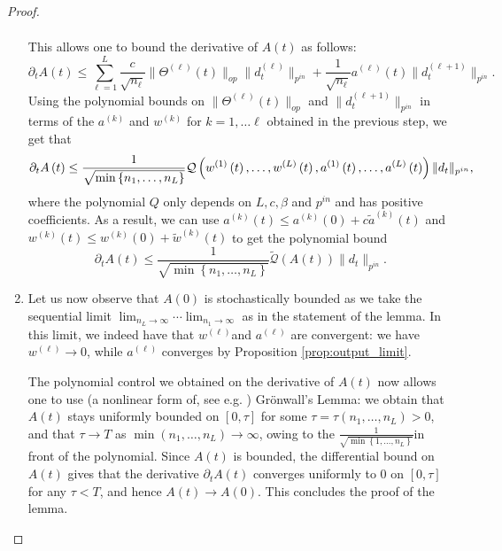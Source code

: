 \documentclass{article}
\begin{document}
\begin{proof}
\begin{enumerate}
\begin{align*}
\end{align*}
This allows one to bound the derivative of $A\left(t\right)$ as follows:
\[
\partial_{t}A\left(t\right)\le\sum_{\ell=1}^{L}\frac{c}{\sqrt{n_{\ell}}}\|\Theta^{(\ell)}(t)\|_{op}\|d_{t}^{(\ell)}\|_{p^{in}}+\frac{1}{\sqrt{n_{\ell}}}a^{\left(\ell\right)}\left(t\right)\|d_{t}^{(\ell+1)}\|_{p^{in}}.
\]
Using the polynomial bounds on $\|\Theta^{(\ell)}(t)\|_{op}$ and
$\|d_{t}^{(\ell+1)}\|_{p^{in}}$ in terms of the $a^{\left(k\right)}$
and $w^{\left(k\right)}$ for $k=1,\ldots\ell$ obtained in the previous
step, we get that 
\[
\text{\ensuremath{\partial_{t}A\left(t\right)\leq\frac{1}{\sqrt{\min\left\{ n_{1},\ldots,n_{L}\right\} }}\mathcal{Q}\left(w^{\left(1\right)}\left(t\right),\ldots,w^{\left(L\right)}\left(t\right),a^{\left(1\right)}\left(t\right),\ldots,a^{\left(L\right)}\left(t\right)\right)\|d_{t}\|_{p^{in}},}}
\]
where the polynomial $Q$ only depends on $L,c,\beta$ and $p^{in}$
and has positive coefficients. As a result, we can use $a^{\left(k\right)}\left(t\right)\leq a^{\left(k\right)}\left(0\right)+c\tilde{a}^{\left(k\right)}\left(t\right)$
and $w^{\left(k\right)}\left(t\right)\leq w^{\left(k\right)}\left(0\right)+\tilde{w}^{\left(k\right)}\left(t\right)$
to get the polynomial bound
\[
\partial_{t}A\left(t\right)\leq\frac{1}{\sqrt{\min\left\{ n_{1},\ldots,n_{L}\right\} }}\tilde{\mathcal{Q}}\left(A\left(t\right)\right)\|d_{t}\|_{p^{in}}.
\]
 

\item
Let us now observe that $A\left(0\right)$ is stochastically bounded
as we take the sequential limit $\lim_{n_{L}\to\infty}\cdots\lim_{n_{1}\to\infty}$
as in the statement of the lemma. In this limit, we indeed have that
$w^{\left(\ell\right)}$and $a^{\left(\ell\right)}$ are convergent: 
we have $w^{\left(\ell\right)}\to0$, while $a^{\left(\ell\right)}$ converges
by Proposition \ref{prop:output_limit}. 

The polynomial control we obtained on the derivative of $A\left(t\right)$
now allows one to use (a nonlinear form of, see e.g. \cite{dragomir}) Grönwall's Lemma: we obtain that $A\left(t\right)$
stays uniformly bounded on $\left[0,\tau\right]$ for some $\tau=\tau\left(n_{1},\ldots,n_{L}\right)>0$,
and that $\tau\to T$ as $\min\left(n_{1},\ldots,n_{L}\right)\to\infty$,
owing to the $\frac{1}{\sqrt{\min\left\{ 1,\ldots,n_{L}\right\} }}$in
front of the polynomial. Since $A\left(t\right)$ is bounded, the
differential bound on $A\left(t\right)$ gives that the derivative
$\partial_{t}A\left(t\right)$ converges uniformly to $0$ on $\left[0,\tau\right]$
for any $\tau<T$, and hence $A\left(t\right)\to A\left(0\right)$.
This concludes the proof of the lemma.


\end{enumerate}
\end{proof}
\end{document}
